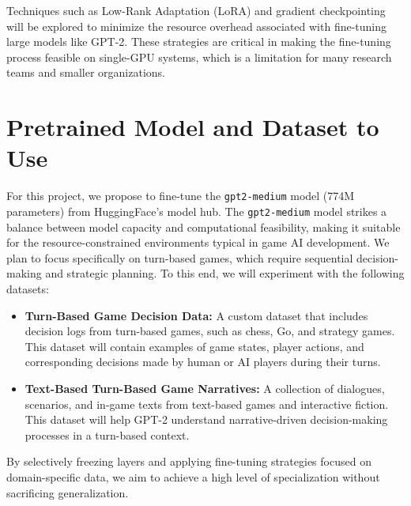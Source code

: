 \documentclass[11pt]{article}
\begin{document}
Techniques such as Low-Rank Adaptation (LoRA) \citep{zeng2023expressive} and gradient checkpointing \citep{singh2024study} will be explored to minimize the resource overhead associated with fine-tuning large models like GPT-2. These strategies are critical in making the fine-tuning process feasible on single-GPU systems, which is a limitation for many research teams and smaller organizations.

\section{Pretrained Model and Dataset to Use}
For this project, we propose to fine-tune the \texttt{gpt2-medium} model (774M parameters) from HuggingFace’s model hub. The \texttt{gpt2-medium} model strikes a balance between model capacity and computational feasibility, making it suitable for the resource-constrained environments typical in game AI development. We plan to focus specifically on turn-based games, which require sequential decision-making and strategic planning. To this end, we will experiment with the following datasets:

\begin{itemize}
    \item \textbf{Turn-Based Game Decision Data:} A custom dataset that includes decision logs from turn-based games, such as chess, Go, and strategy games. This dataset will contain examples of game states, player actions, and corresponding decisions made by human or AI players during their turns.
    \item \textbf{Text-Based Turn-Based Game Narratives:} A collection of dialogues, scenarios, and in-game texts from text-based games and interactive fiction. This dataset will help GPT-2 understand narrative-driven decision-making processes in a turn-based context.
\end{itemize}

By selectively freezing layers and applying fine-tuning strategies focused on domain-specific data, we aim to achieve a high level of specialization without sacrificing generalization.
\end{document}
